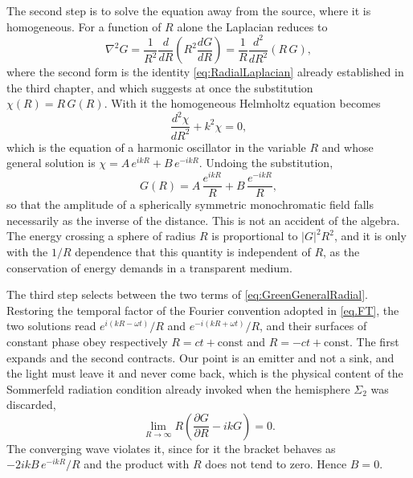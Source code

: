 		The second step is to solve the equation away from the source, where it is homogeneous. For a function of $R$ alone the Laplacian reduces to
		\begin{equation}\label{eq:GreenRadialLaplacian}
			\nabla^{2}G = \frac{1}{R^{2}}\frac{d}{dR}\left(R^{2}\frac{dG}{dR}\right) = \frac{1}{R}\frac{d^{2}}{dR^{2}}\left(R\,G\right),
		\end{equation}
		where the second form is the identity \eqref{eq:RadialLaplacian} already established in the third chapter, and which suggests at once the substitution $\chi(R) = R\,G(R)$. With it the homogeneous Helmholtz equation becomes
		\begin{equation}\label{eq:RadialOscillator}
			\frac{d^{2}\chi}{dR^{2}} + k^{2}\chi = 0 ,
		\end{equation}
		which is the equation of a harmonic oscillator in the variable $R$ and whose general solution is $\chi = A\,e^{ikR} + B\,e^{-ikR}$. Undoing the substitution,
		\begin{equation}\label{eq:GreenGeneralRadial}
			G(R) = A\,\frac{e^{ikR}}{R} + B\,\frac{e^{-ikR}}{R},
		\end{equation}
		so that the amplitude of a spherically symmetric monochromatic field falls necessarily as the inverse of the distance. This is not an accident of the algebra. The energy crossing a sphere of radius $R$ is proportional to $|G|^{2}R^{2}$, and it is only with the $1/R$ dependence that this quantity is independent of $R$, as the conservation of energy demands in a transparent medium.

		The third step selects between the two terms of \eqref{eq:GreenGeneralRadial}. Restoring the temporal factor of the Fourier convention adopted in \eqref{eq.FT}, the two solutions read $e^{i(kR-\omega t)}/R$ and $e^{-i(kR+\omega t)}/R$, and their surfaces of constant phase obey respectively $R = ct + \text{const}$ and $R = -ct + \text{const}$. The first expands and the second contracts. Our point is an emitter and not a sink, and the light must leave it and never come back, which is the physical content of the Sommerfeld radiation condition already invoked when the hemisphere $\Sigma_{2}$ was discarded,
		\begin{equation}\label{eq:SommerfeldRadiation}
			\lim_{R\to\infty} R\left(\frac{\partial G}{\partial R} - ikG\right) = 0 .
		\end{equation}
		The converging wave violates it, since for it the bracket behaves as $-2ikB\,e^{-ikR}/R$ and the product with $R$ does not tend to zero. Hence $B = 0$.

